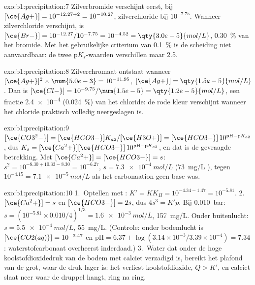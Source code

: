 \begin{solution}{exo:b1:precipitation:7}
Zilverbromide verschijnt eerst, bij $[\ce{Ag+}] = 10^{-12.27 + 2} =
10^{-10.27}$, zilverchloride bij $10^{-7.75}$. Wanneer zilverchloride
verschijnt, is $[\ce{Br-}] = 10^{-12.27}/10^{-7.75} = 10^{-4.52} =
\qty{3.0e-5}{mol/L}$, \qty{0.30}{\percent} van het bromide. Met het
gebruikelijke criterium van \qty{0.1}{\percent} is de scheiding niet
aanvaardbaar: de twee $\mathrm{p}K_s$-waarden verschillen maar 2.5.
\end{solution}

\begin{solution}{exo:b1:precipitation:8}
Zilverchromaat ontstaat wanneer $[\ce{Ag+}]^2 \times \num{5.0e-3} = 10^{-11.95}$,
$[\ce{Ag+}] = \qty{1.5e-5}{mol/L}$. Dan is $[\ce{Cl-}] = 10^{-9.75}/\num{1.5e-5}
= \qty{1.2e-5}{mol/L}$, een fractie \num{2.4e-4} (\qty{0.024}{\percent})
van het chloride: de rode kleur verschijnt wanneer het chloride praktisch
volledig neergeslagen is.
\end{solution}

\begin{solution}{exo:b1:precipitation:9}
$[\ce{CO3^2-}] = [\ce{HCO3-}]K_{a2}/[\ce{H3O+}] = [\ce{HCO3-}]\,10^{\mathrm{pH}
- \mathrm{p}K_{a2}}$, dus $K_s = [\ce{Ca^2+}][\ce{HCO3-}]\,10^{\mathrm{pH} -
\mathrm{p}K_{a2}}$, en dat is de gevraagde betrekking. Met $[\ce{Ca^2+}] =
[\ce{HCO3-}] = s$: $s^2 = 10^{-8.30 + 10.33 - 8.30} = 10^{-6.27}$,
$s = \qty{7.3e-4}{mol/L}$ (\qty{73}{mg/L} ), tegen
$10^{-4.15} = \qty{7.1e-5}{mol/L}$ als het carbonaation geen base was.
\end{solution}

\begin{solution}{exo:b1:precipitation:10}
1.~Optellen met : $K' = K K_H = 10^{-4.34 - 1.47} =
10^{-5.81}$.
2.~$[\ce{Ca^2+}] = s$ en $[\ce{HCO3-}] = 2s$, dus $4s^3 = K'p$. Bij
\qty{0.010}{bar}: $s = (10^{-5.81} \times 0.010/4)^{1/3} =
\qty{1.6e-3}{mol/L}$, \qty{157}{mg/L}. Onder buitenlucht:
$s = \qty{5.5e-4}{mol/L}$, \qty{55}{mg/L}. (Controle: onder bodemlucht is
$[\ce{CO2(aq)}] = 10^{-3.47}$ en $\mathrm{pH} = 6.37 + \log(3.14\times
10^{-3}/3.39 \times 10^{-4}) = 7.34$: waterstofcarbonaat overheerst
inderdaad.)
3.~Water dat onder de hoge koolstofdioxidedruk van de bodem met calciet
verzadigd is, bereikt het plafond van de grot, waar de druk lager is:
het verliest koolstofdioxide, $Q > K'$, en calciet slaat neer waar de
druppel hangt, ring na ring.
\end{solution}


